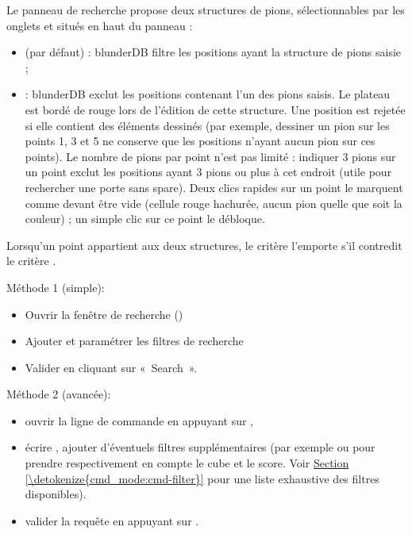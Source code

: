 \documentclass[letterpaper,10pt,french]{sphinxmanual}
\begin{document}
\sphinxAtStartPar
Le panneau de recherche propose deux structures de pions, sélectionnables par
les onglets  et  situés en haut du panneau :
\begin{itemize}
\item {} 
\sphinxAtStartPar
{} (par défaut) : blunderDB filtre les positions ayant  la
structure de pions saisie ;

\item {} 
\sphinxAtStartPar
{} : blunderDB exclut les positions contenant l’un des pions saisis. Le
plateau est bordé de rouge lors de l’édition de cette structure. Une position
est rejetée si elle contient  des éléments dessinés (par exemple,
dessiner un pion sur les points 1, 3 et 5 ne conserve que les positions n’ayant
aucun pion sur ces points). Le nombre de pions par point n’est pas limité :
indiquer 3 pions sur un point exclut les positions ayant 3 pions ou plus à cet
endroit (utile pour rechercher une porte sans spare). Deux clics rapides sur un
point le marquent comme devant être vide (cellule rouge hachurée, aucun pion
quelle que soit la couleur) ; un simple clic sur ce point le débloque.

\end{itemize}

\sphinxAtStartPar
Lorsqu’un point appartient aux deux structures, le critère  l’emporte
s’il contredit le critère .

\sphinxAtStartPar
Méthode 1 (simple):
\begin{itemize}
\item {} 
\sphinxAtStartPar
Ouvrir la fenêtre de recherche ()

\item {} 
\sphinxAtStartPar
Ajouter et paramétrer les filtres de recherche

\item {} 
\sphinxAtStartPar
Valider en cliquant sur « Search ».

\end{itemize}

\sphinxAtStartPar
Méthode 2 (avancée):
\begin{itemize}
\item {} 
\sphinxAtStartPar
ouvrir la ligne de commande en appuyant sur ,

\item {} 
\sphinxAtStartPar
écrire , ajouter d’éventuels filtres supplémentaires (par exemple
 ou  pour prendre respectivement en compte le cube et le
score. Voir \hyperref[\detokenize{cmd_mode:cmd-filter}]{Section \ref{\detokenize{cmd_mode:cmd-filter}}} pour une liste exhaustive des
filtres disponibles).

\item {} 
\sphinxAtStartPar
valider la requête en appuyant sur .

\end{itemize}
\end{document}
